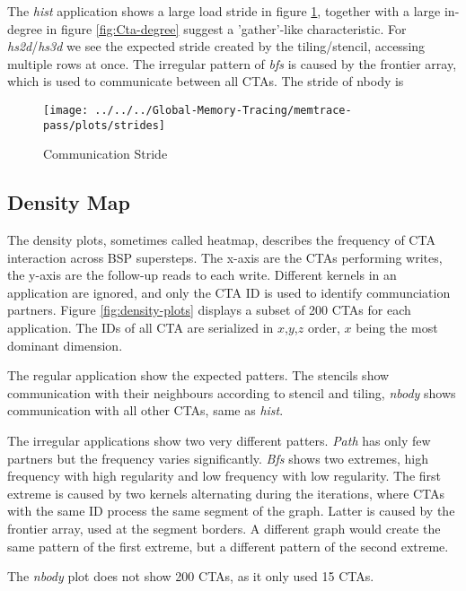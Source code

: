 The \textit{hist} application shows a large load stride in figure \ref{com-stride}, together with a large in-degree in figure \ref{fig:Cta-degree} suggest a 'gather'-like characteristic. For \textit{hs2d}/\textit{hs3d} we see the expected stride created by the tiling/stencil, accessing multiple rows at once.
The irregular pattern of \textit{bfs} is caused by the frontier array, which is used to communicate between all CTAs. The stride of nbody
is
\begin{figure}[h!]
	\centering
	\texttt{[image: ../../../Global-Memory-Tracing/memtrace-pass/plots/strides]}
	\caption{Communication Stride}
	\label{com-stride}
\end{figure}
\subsection{Density Map}
The density plots, sometimes called heatmap, describes the frequency of CTA interaction across BSP supersteps. The x-axis are the CTAs performing writes, the y-axis are the follow-up reads to each write. Different kernels in an application are ignored, and only the CTA ID is used to identify communciation partners. Figure \ref{fig:density-plots} displays a subset of 200 CTAs for each application. The IDs of all CTA are serialized in $x$,$y$,$z$ order, $x$ being the most dominant dimension. 

The regular application show the expected patters. The stencils show communication with their neighbours according to stencil and tiling, \textit{nbody} shows communication with all other CTAs, same as \textit{hist}.

The irregular applications show two very different patters. \textit{Path} has only few partners but the frequency varies significantly. \textit{Bfs} shows two extremes, high frequency with high regularity and low frequency with low regularity.
The first extreme is caused by two kernels alternating during the iterations, where CTAs with the same ID process the same segment of the graph.  Latter is caused by the frontier array, used at the segment borders. A different graph would create the same pattern of the first extreme, but a different pattern of the second extreme.

The \textit{nbody} plot does not show 200 CTAs, as it only used 15 CTAs.

